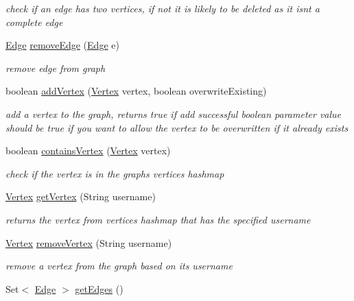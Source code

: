 \begin{DoxyCompactItemize}
\begin{DoxyCompactList}\small\item\em check if an edge has two vertices, if not it is likely to be deleted as it isn\textquotesingle{}t a complete edge \end{DoxyCompactList}\item 
\hyperlink{class_edge}{Edge} \hyperlink{class_graph_a5dc8b9103d5d3fb7647b71df8fd35dbb}{remove\+Edge} (\hyperlink{class_edge}{Edge} e)
\begin{DoxyCompactList}\small\item\em remove edge from graph \end{DoxyCompactList}\item 
boolean \hyperlink{class_graph_aff10c71da13d18adef73c4d20c25c895}{add\+Vertex} (\hyperlink{class_vertex}{Vertex} vertex, boolean overwrite\+Existing)
\begin{DoxyCompactList}\small\item\em add a vertex to the graph, returns true if add successful boolean parameter value should be true if you want to allow the vertex to be overwritten if it already exists \end{DoxyCompactList}\item 
boolean \hyperlink{class_graph_a0380eb64afa8f2264eb2472bf62490a2}{contains\+Vertex} (\hyperlink{class_vertex}{Vertex} vertex)
\begin{DoxyCompactList}\small\item\em check if the vertex is in the graphs vertices hashmap \end{DoxyCompactList}\item 
\hyperlink{class_vertex}{Vertex} \hyperlink{class_graph_a9ec421fd3402f637af8a9e99be3bb72c}{get\+Vertex} (String username)
\begin{DoxyCompactList}\small\item\em returns the vertex from vertices hashmap that has the specified username \end{DoxyCompactList}\item 
\hyperlink{class_vertex}{Vertex} \hyperlink{class_graph_a1253c513b85d91e2c6f60e36863c2fc9}{remove\+Vertex} (String username)
\begin{DoxyCompactList}\small\item\em remove a vertex from the graph based on its username \end{DoxyCompactList}\item 
Set$<$ \hyperlink{class_edge}{Edge} $>$ \hyperlink{class_graph_a292e75a764615c537377c66a1deece30}{get\+Edges} ()

\end{DoxyCompactItemize}
